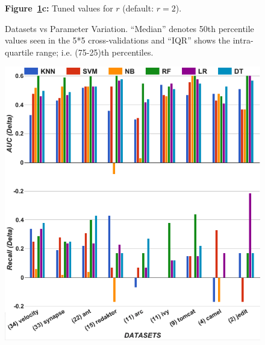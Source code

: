 \documentclass[10pt,conference]{IEEEtran}
\theoremstyle{break}
\theoremstyle{break}
\begin{document}
\begin{figure}[!b]
\begin{minipage}{.33\textwidth}
        {\bf Figure~\ref{fig:para}c:} Tuned values for $r$ (default:  $r=2$).
    \end{minipage}
    \caption{Datasets vs Parameter Variation.
    ``Median'' denotes 50th percentile values seen in the 5*5 cross-validations and ``IQR'' shows the intra-quartile
    range; i.e. (75-25)th percentiles.}
    \label{fig:para}
\vspace{-0.4cm}
\end{figure}



 
\begin{figure}[!t]
\begin{minipage}{.5\linewidth}
\centering
        \includegraphics[width=.95\linewidth]{./fig/AUC_recall_tuned.png}
    \end{minipage}%
\begin{minipage}{.5\linewidth}
        \centering

\end{minipage}
\end{figure}
\end{document}
